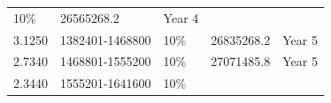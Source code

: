 \documentclass[11pt,a4paperpaper,]{report}
\begin{document}
\begin{longtable}[]{@{}llllc@{}}
\begin{minipage}[t]{0.14\columnwidth}
10\%\strut
\end{minipage} & \begin{minipage}[t]{0.19\columnwidth}\raggedright\strut
26565268.2\strut
\end{minipage} & \begin{minipage}[t]{0.16\columnwidth}\centering\strut
Year 4\strut
\end{minipage}\tabularnewline
\begin{minipage}[t]{0.12\columnwidth}\raggedright\strut
3.1250\strut
\end{minipage} & \begin{minipage}[t]{0.23\columnwidth}\raggedright\strut
1382401-1468800\strut
\end{minipage} & \begin{minipage}[t]{0.14\columnwidth}\raggedright\strut
10\%\strut
\end{minipage} & \begin{minipage}[t]{0.19\columnwidth}\raggedright\strut
26835268.2\strut
\end{minipage} & \begin{minipage}[t]{0.16\columnwidth}\centering\strut
Year 5\strut
\end{minipage}\tabularnewline
\begin{minipage}[t]{0.12\columnwidth}\raggedright\strut
2.7340\strut
\end{minipage} & \begin{minipage}[t]{0.23\columnwidth}\raggedright\strut
1468801-1555200\strut
\end{minipage} & \begin{minipage}[t]{0.14\columnwidth}\raggedright\strut
10\%\strut
\end{minipage} & \begin{minipage}[t]{0.19\columnwidth}\raggedright\strut
27071485.8\strut
\end{minipage} & \begin{minipage}[t]{0.16\columnwidth}\centering\strut
Year 5\strut
\end{minipage}\tabularnewline
\begin{minipage}[t]{0.12\columnwidth}\raggedright\strut
2.3440\strut
\end{minipage} & \begin{minipage}[t]{0.23\columnwidth}\raggedright\strut
1555201-1641600\strut
\end{minipage} & \begin{minipage}[t]{0.14\columnwidth}\raggedright\strut
10\%\strut
\end{minipage} & \begin{minipage}[t]{0.19\columnwidth}\raggedright\strut

\end{minipage}
\end{longtable}
\end{document}
